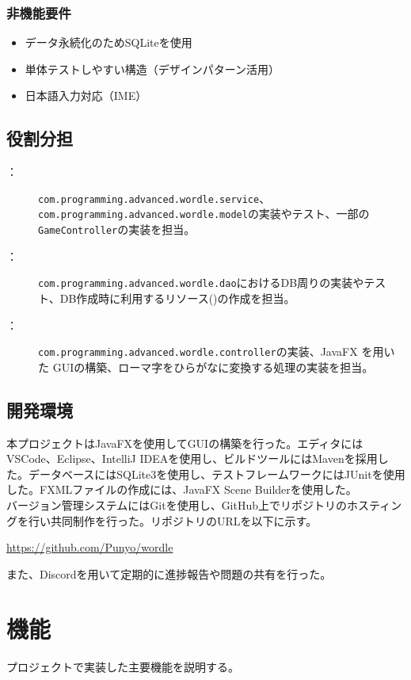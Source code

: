 \documentclass[a4j]{ujarticle}
\begin{document}
\subsubsection{非機能要件}
\begin{itemize}
  \item データ永続化のためSQLiteを使用
  \item 単体テストしやすい構造（デザインパターン活用）
  \item 日本語入力対応（IME）
\end{itemize}
\subsection{役割分担}
\begin{description}
  \item[：]\texttt{com.programming.advanced.wordle.service}、\texttt{com.programming.advanced.wordle.model}の実装やテスト、一部の\texttt{GameController}の実装を担当。
  \item[：]\texttt{com.programming.advanced.wordle.dao}におけるDB周りの実装やテスト、DB作成時に利用するリソース()の作成を担当。
  \item[：]\texttt{com.programming.advanced.wordle.controller}の実装、JavaFX を用いた GUIの構築、ローマ字をひらがなに変換する処理の実装を担当。
\end{description}
\subsection{開発環境}
本プロジェクトはJavaFXを使用してGUIの構築を行った。エディタにはVSCode、Eclipse、IntelliJ IDEAを使用し、ビルドツールにはMavenを採用した。データベースにはSQLite3を使用し、テストフレームワークにはJUnitを使用した。FXMLファイルの作成には、JavaFX Scene Builderを使用した。\\
バージョン管理システムにはGitを使用し、GitHub上でリポジトリのホスティングを行い共同制作を行った。リポジトリのURLを以下に示す。
\begin{center}
  \url{https://github.com/Punyo/wordle}
\end{center}
また、Discordを用いて定期的に進捗報告や問題の共有を行った。
\section{機能}
プロジェクトで実装した主要機能を説明する。
\end{document}
